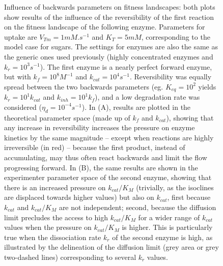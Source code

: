 \begin{figure}[h!]
\begin{minipage}[c]{0.49\linewidth}
\end{minipage}
\caption{Influence of backwards parameters on fitness landscapes: both plots show results of the influence of the reversibility of the first reaction on the fitness landscape of the following enzyme. Parameters for uptake are $V_{Tm}=1mM.s^{-1}$ and $K_T=5mM$, corresponding to the model case for sugars. The settings for enzymes are also the same as the generic ones used previously (highly concentrated enzymes and $k_r=10^3s^{-1}$).%
The first enzyme is a nearly perfect forward enzyme, but with $k_f=10^{8}M^{-1}$ and $k_{cat}=10^4s^{-1}$. Reversibility was equally spread between the two backwards parameters (eg. $K_{eq}=10^2$ yields $k_r=10^{1}k_{cat}$ and $k_{inh}=10^{1}k_f$), and a low degradation rate was considered ($\eta_d=10^{-4}s^{-1}$). In (A), results are plotted in the theoretical parameter space (made up of $k_f$ and $k_{cat}$), showing that any increase in reversibility increases the pressure on enzyme kinetics by the same magnitude -- except when reactions are highly irreversible (in red) -- because the first product, instead of accumulating, may thus often react backwards and limit the flow progressing forward. In (B), the same results are shown in the experimenter parameter space of the second enzyme, showing that there is an increased pressure on $k_{cat}/K_M$ (trivially, as the isoclines are displaced towards higher values) but also on $k_{cat}$, first because $k_{cat}$ and $k_{cat}/K_M$ are not independent; second, because the diffusion limit precludes the access to high $k_{cat}/K_M$ for a wider range of $k_{cat}$ values when the pressure on $k_{cat}/K_M$ is higher. This is particularly true when the dissociation rate $k_r$ of the second enzyme is high, as illustrated by the delineation of the diffusion limit (grey area or grey two-dashed lines) corresponding to several $k_r$ values.}
\label{fig8-ann}
\end{figure}

